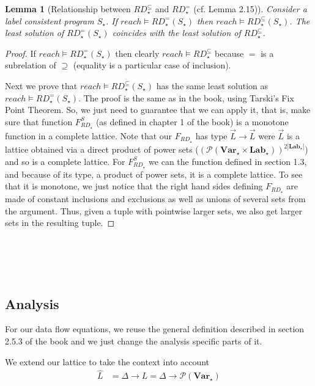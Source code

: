 \documentclass[a4wide,12pt]{article}
\theoremstyle{definition}
\theoremstyle{plain}
\newtheorem{lemma}[theo]{Lemma}
\theoremstyle{remark}
\def\pset#1{\mathcal{P}(#1)}
\def\Lab {\mathbf{Lab}}
\def\Var {\mathbf{Var}}
\begin{document}
\begin{lemma}[Relationship between $RD_\star^\subseteq$ and $RD_\star^=$ (cf. Lemma 2.15)]
Consider a label consistent program $S_\star$.  If $reach \models RD_\star^=(S_\star)$
then $reach \models RD_\star^\subseteq(S_\star)$. The least solution of $RD_\star^=(S_\star)$ coincides
with the least solution of $RD_\star^\subseteq$.
\end{lemma}
\begin{proof}
If $reach \models RD_\star^=(S_\star)$
then clearly $reach \models RD^\subseteq_\star$ because $=$ is a subrelation of $\supseteq$
(equality is a particular case of inclusion).

Next we prove that $reach \models RD_\star^\subseteq(S_\star)$ has the same least solution
as  $reach \models RD_\star^=(S_\star)$.
The proof is the same as in the book, using Tarski's Fix Point Theorem.
So, we just need to guarantee that we can apply it, that is, make sure that 
function $F_{RD_\star}^S$ (as defined in chapter 1 of the book) is a monotone
function in a complete lattice.
Note that our $F_{RD_\star}$
has type $\vec{L} \to \vec{L}$ were $\vec{L}$ is a lattice obtained via a direct product
of power sets ($(\pset{\Var_\star \times \Lab_\star})^{2|\Lab_\star|}$) and so is a complete lattice. 
For $F_{RD_\star}^S$ we can the function defined in section 1.3, and because of its
type, a product of power sets, it is a complete lattice. To see that it is monotone,
we just notice that the right hand sides defining $F_{RD_\star}$ are made of constant inclusions and
exclusions as well as unions of several sets from the argument. Thus, given a tuple with pointwise
larger sets, we also get larger sets in the resulting tuple.
\end{proof}


\section{~} 

\subsection{Analysis}

For our data flow equations, we reuse the general definition 
described in section 2.5.3 of the book and we just change the analysis specific parts of it.

We extend our lattice to take the context into account
\begin{align*}
\widehat{L} & = \Delta \to L = \Delta \to \pset{\Var_\star}
\end{align*}
\end{document}
